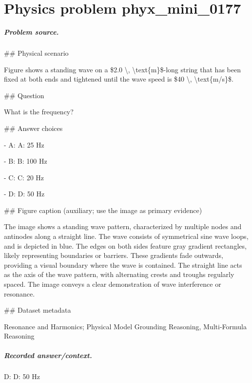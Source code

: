 
\chapter{Physics problem phyx\_mini\_0177}
\label{ch:PhyXMiniProblems_problem_phyx_mini_0177}

\paragraph{Problem source.}
\#\# Physical scenario

Figure shows a standing wave on a \$2.0 \textbackslash{}, \textbackslash{}text\{m\}\$-long string that has been fixed at both ends and tightened until the wave speed is \$40 \textbackslash{}, \textbackslash{}text\{m/s\}\$.

\#\# Question

What is the frequency?

\#\# Answer choices

- A: A: 25 Hz

- B: B: 100 Hz

- C: C: 20 Hz

- D: D: 50 Hz

\#\# Figure caption (auxiliary; use the image as primary evidence)

The image shows a standing wave pattern, characterized by multiple nodes and antinodes along a straight line. The wave consists of symmetrical sine wave loops, and is depicted in blue. The edges on both sides feature gray gradient rectangles, likely representing boundaries or barriers. These gradients fade outwards, providing a visual boundary where the wave is contained. The straight line acts as the axis of the wave pattern, with alternating crests and troughs regularly spaced. The image conveys a clear demonstration of wave interference or resonance.

\#\# Dataset metadata

Resonance and Harmonics; Physical Model Grounding Reasoning, Multi-Formula Reasoning

\paragraph{Recorded answer/context.}
D: D: 50 Hz

